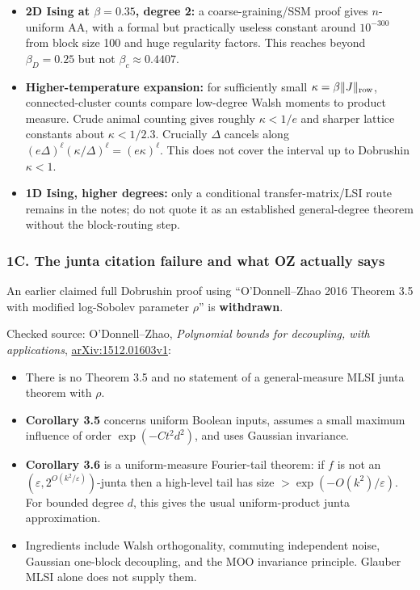 \begin{itemize}
\tightlist
\item
  \textbf{2D Ising at \(\beta=0.35\), degree 2:} a coarse-graining/SSM proof gives \(n\)-uniform AA, with a formal but practically useless constant around \(10^{-300}\) from block size 100 and huge regularity factors. This reaches beyond \(\beta_D=0.25\) but not \(\beta_c\approx0.4407\).
\item
  \textbf{Higher-temperature expansion:} for sufficiently small \(\kappa=\beta\|J\|_{\rm row}\), connected-cluster counts compare low-degree Walsh moments to product measure. Crude animal counting gives roughly \(\kappa<1/e\) and sharper lattice constants about \(\kappa<1/2.3\). Crucially \(\Delta\) cancels along \((e\Delta)^\ell(\kappa/\Delta)^\ell=(e\kappa)^\ell\). This does not cover the interval up to Dobrushin \(\kappa<1\).
\item
  \textbf{1D Ising, higher degrees:} only a conditional transfer-matrix/LSI route remains in the notes; do not quote it as an established general-degree theorem without the block-routing step.
\end{itemize}

\subsubsection{1C. The junta citation failure and what OZ actually says}\label{c.-the-junta-citation-failure-and-what-oz-actually-says}

An earlier claimed full Dobrushin proof using ``O'Donnell--Zhao 2016 Theorem 3.5 with modified log-Sobolev parameter \(\rho\)'' is \textbf{withdrawn}.

Checked source: O'Donnell--Zhao, \emph{Polynomial bounds for decoupling, with applications}, \href{https://arxiv.org/html/1512.01603v1}{arXiv:1512.01603v1}:

\begin{itemize}
\tightlist
\item
  There is no Theorem 3.5 and no statement of a general-measure MLSI junta theorem with \(\rho\).
\item
  \textbf{Corollary 3.5} concerns uniform Boolean inputs, assumes a small maximum influence of order \(\exp(-Ct^2d^2)\), and uses Gaussian invariance.
\item
  \textbf{Corollary 3.6} is a uniform-measure Fourier-tail theorem: if \(f\) is not an \((\varepsilon,2^{O(k^2/\varepsilon)})\)-junta then a high-level tail has size \(>\exp(-O(k^2)/\varepsilon)\). For bounded degree \(d\), this gives the usual uniform-product junta approximation.
\item
  Ingredients include Walsh orthogonality, commuting independent noise, Gaussian one-block decoupling, and the MOO invariance principle. Glauber MLSI alone does not supply them.
\end{itemize}

